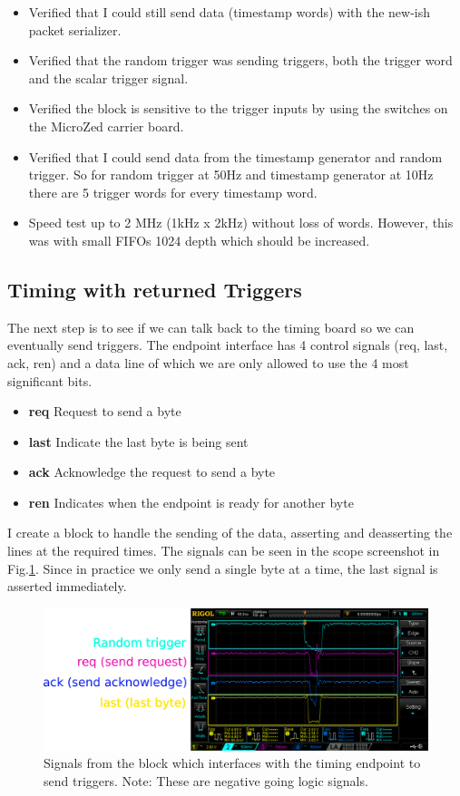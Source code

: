 \documentclass[]{report}
\begin{document}
	\begin{itemize}
		\item[1.] Verified that I could still send data (timestamp words) with the new-ish packet serializer. 
		\item[2.] Verified that the random trigger was sending triggers, both the trigger word and the scalar trigger signal.
		\item[3.] Verified the block is sensitive to the trigger inputs by using the switches on the MicroZed carrier board. 
		\item[4.] Verified that I could send data from the timestamp generator and random trigger. So for random trigger at 50Hz and timestamp generator at 10Hz there are 5 trigger words for every timestamp word.
		\item[5.] Speed test up to 2 MHz (1kHz x 2kHz) without loss of words. However, this was with small FIFOs 1024 depth which should be increased.
	\end{itemize}

\subsection{Timing with returned Triggers}

The next step is to see if we can talk back to the timing board so we can eventually send triggers. The endpoint interface has 4 control signals (req, last, ack, ren) and a data line of which we are only allowed to use the 4 most significant bits.
	\begin{itemize}
		\item \textbf{req} Request to send a byte
		\item \textbf{last} Indicate the last byte is being sent
		\item \textbf{ack} Acknowledge the request to send a byte
		\item \textbf{ren} Indicates when the endpoint is ready for another byte
	\end{itemize}
	
I create a block to handle the sending of the data, asserting and deasserting the lines at the required times. The signals can be seen in the scope screenshot in Fig.\ref{fig:trigger_sigs}. Since in practice we only send a single byte at a time, the last signal is asserted immediately.

	 \begin{figure}[H]
	 	\centering
	 	\includegraphics[width=6.25in]{trigger_return_edit.png}
	 	\caption{Signals from the block which interfaces with the timing endpoint to send triggers. Note: These are negative going logic signals.}
	 	\label{fig:trigger_sigs}
	 \end{figure}
	 
\end{document}
